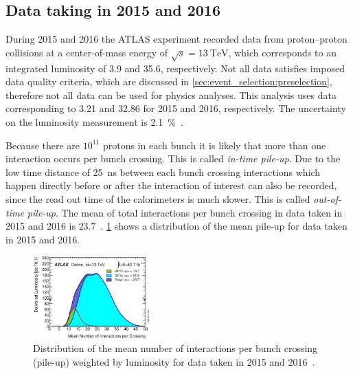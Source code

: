 \subsection{Data taking in 2015 and 2016}\label{sec:setup:data}

During 2015 and 2016 the ATLAS experiment recorded data from proton--proton collisions at a center-of-mass energy
of $\sqrt{s} = \SI{13}{\TeV}$, which corresponds to an integrated luminosity of \SI{3.9}{\invfb} and \SI{35.6}{\invfb}, respectively.
Not all data satisfies imposed data quality criteria, which are discussed in \cref{sec:event_selection:preselection},
therefore not all data can be used for physics analyses.
This analysis uses data corresponding to \SI{3.21}{\invfb} and \SI{32.86}{\invfb} for 2015 and 2016, respectively.
The uncertainty on the luminosity measurement is \SI{2.1}{\percent}~\cite{LumiUncertRun2}.

Because there are $10^{11}$ protons in each bunch it is likely that more than one interaction occurs per bunch crossing.
This is called \emph{in-time pile-up}.
Due to the low time distance of \SI{25}{\ns} between each bunch crossing interactions which happen directly before or after
the interaction of interest can also be recorded, since the read out time of the calorimeters is much slower.
This is called \emph{out-of-time pile-up}.
The mean of total interactions per bunch crossing in data taken in 2015 and 2016 is $23.7$~\cite{PublicLumiRun2}.
\cref{fig:setup:pileup} shows a distribution of the mean pile-up for data taken in 2015 and 2016.

\begin{figure}[htb]
    \centering
    \includegraphics[width=0.4\textwidth]{./figures/setup/pileup_2015_2016.eps}
    \caption{Distribution of the mean number of interactions per bunch crossing (pile-up)
             weighted by luminosity for data taken in 2015 and 2016~\cite{PublicLumiRun2}.}\label{fig:setup:pileup}
\end{figure}
